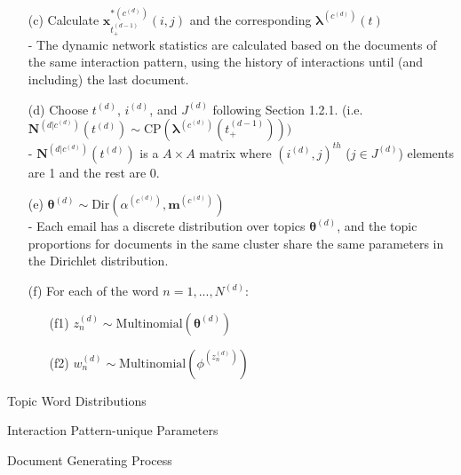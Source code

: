 \documentclass[a4paper]{article}
\begin{document}
\begin{itemize}
\begin{itemize}
				\item[(c)] Calculate $\boldsymbol{x}^{*(c^{(d)})}_{t_+^{(d-1)}}(i, j)$ and the corresponding $\boldsymbol{\lambda}^{(c^{(d)})}(t)$\\
			- The dynamic network statistics are calculated based on the documents of the same interaction pattern, using the history of interactions until (and including) the last document.
		\item[(d)] Choose $t^{(d)}$, $i^{(d)}$, and $J^{(d)}$ following Section 1.2.1. (i.e. $\mathbf{N}^{(d|c^{(d)})}(t^{(d)}) \sim \mbox{CP}(\boldsymbol{\lambda}^{(c^{(d)})}(t_+^{(d-1)})))$\\
		- $\mathbf{N}^{(d|c^{(d)})}(t^{(d)})$ is a $A\times A$ matrix where $(i^{(d)}, j)^{th}$ ($j \in J^{(d)}$) elements are 1 and the rest are 0.
		\item[(e)] $\boldsymbol{\theta}^{(d)}\sim \mbox{Dir}(\alpha^{(c^{(d)})}, \boldsymbol{m}^{(c^{(d)})})$\\
		- Each email has a discrete distribution over topics $\boldsymbol{\theta}^{(d)}$, and the topic proportions for documents in the same cluster share the same parameters in the Dirichlet distribution.
	\item[(f)] For each of the word $n = 1,...,N^{(d)}$:
\begin{itemize}
	\item [(f1)] $z_n^{(d)} \sim \mbox{Multinomial}(\boldsymbol{\theta}^{(d)})$
	\item [(f2)] $w_n^{(d)} \sim\mbox{Multinomial} (\phi^{(z_n^{(d)})})$
\end{itemize} 
	\end{itemize}
\end{itemize}
\begin{algorithm}[H]
	\SetAlgoLined
	\caption{Topic Word Distributions}
\end{algorithm}
\begin{algorithm}[H]
	\SetAlgoLined
	\caption{Interaction Pattern-unique Parameters}
\end{algorithm}
	\begin{algorithm}[H]
		\SetAlgoLined
		\caption{Document Generating Process}
	\end{algorithm}
\end{document}
